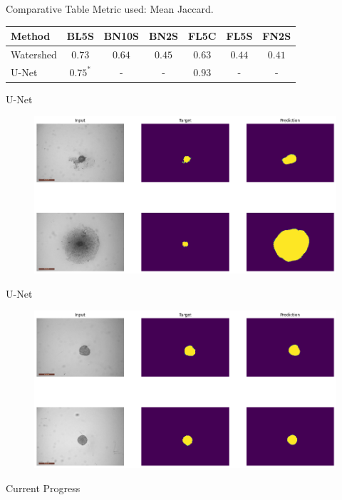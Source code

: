 
\begin{frame}{Comparative Table}
    Metric used: \alert{Mean Jaccard}.
    \begin{table}[]
        \centering
        \setlength{\tabcolsep}{10pt}
        
        {
            \begin{tabular}{lcccccc}
                Method & BL5S & BN10S & BN2S & FL5C & FL5S & FN2S \\
                \midrule
                Watershed & $0.73$ & $0.64$ & $0.45$ &  $0.63$ & $0.44$ & $0.41$ \\
                U-Net & $0.75^*$ & - & - & $0.93$ & - & -
            \end{tabular}
        }
    \end{table}
\end{frame}


\begin{frame}{U-Net}
    \begin{figure}[!htb]
        \centering
        \includegraphics[width=13cm]{figures/result/wrong_example}
    \end{figure}
\end{frame}


\begin{frame}{U-Net}
    \begin{figure}[!htb]
        \centering
        \includegraphics[width=13cm]{figures/result/better_example}
    \end{figure}
\end{frame}

\begin{frame}{Current Progress}
\end{frame}